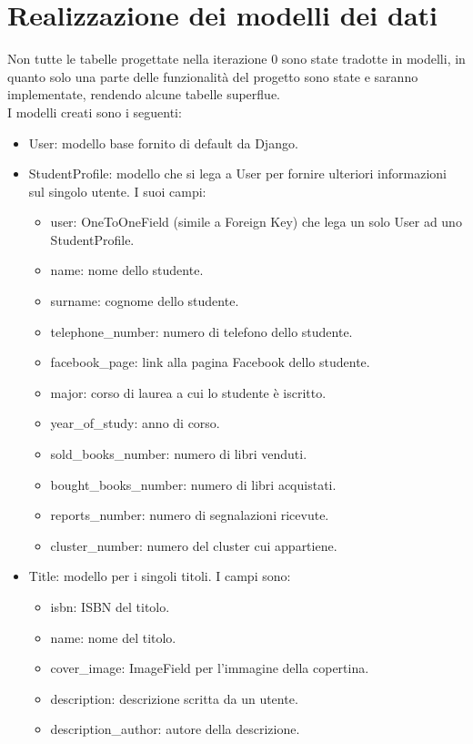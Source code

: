 \documentclass[10pt,a4paper]{report}
\begin{document}
	\section{Realizzazione dei modelli dei dati}
	Non tutte le tabelle progettate nella iterazione 0 sono state tradotte in modelli, in quanto solo una parte delle funzionalità del progetto sono state e saranno implementate, rendendo alcune tabelle superflue. \\
	I modelli creati sono i seguenti:
	\begin{itemize}
		\item User: modello base fornito di default da Django. 
		\item StudentProfile: modello che si lega a User per fornire ulteriori informazioni sul singolo utente. I suoi campi:
		\begin{itemize}
			\item user: OneToOneField (simile a Foreign Key) che lega un solo User ad uno StudentProfile.
			\item name: nome dello studente.
			\item surname: cognome dello studente.
			\item telephone\_number: numero di telefono dello studente.
			\item facebook\_page: link alla pagina Facebook dello studente.
			\item major: corso di laurea a cui lo studente è iscritto.
			\item year\_of\_study: anno di corso.
			\item sold\_books\_number: numero di libri venduti.
			\item bought\_books\_number: numero di libri acquistati.
			\item reports\_number: numero di segnalazioni ricevute.
			\item cluster\_number: numero del cluster cui appartiene.
		\end{itemize}
		\item Title: modello per i singoli titoli. I campi sono:
			\begin{itemize}
				\item isbn: ISBN del titolo.
				\item name: nome del titolo.
				\item cover\_image: ImageField per l'immagine della copertina.
				\item description: descrizione scritta da un utente.
				\item description\_author: autore della descrizione.

\end{itemize}
\end{itemize}
\end{document}
